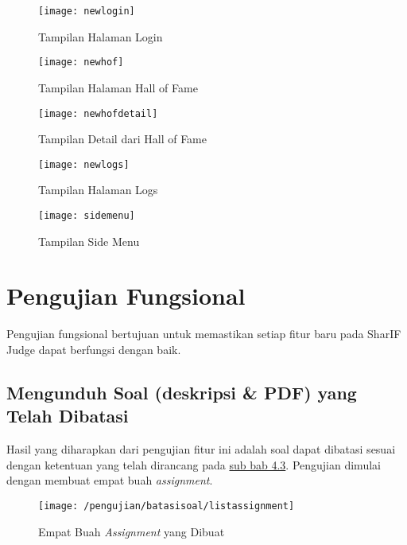 \begin{enumerate}
	\begin{figure}[H]
		\centering  
		\texttt{[image: newlogin]}  
		\caption[Tampilan Halaman Login]{Tampilan Halaman Login} 
		\label{fig:newlogin} 
	\end{figure}
	
	\begin{figure}[H]
		\centering  
		\texttt{[image: newhof]}  
		\caption[Tampilan Halaman Hall of Fame]{Tampilan Halaman Hall of Fame} 
		\label{fig:newhof} 
	\end{figure}

	\begin{figure}[H]
		\centering  
		\texttt{[image: newhofdetail]}  
		\caption[Tampilan Detail dari Hall of Fame]{Tampilan Detail dari Hall of Fame} 
		\label{fig:newhofdetail} 
	\end{figure}

	\begin{figure}[H]
		\centering  
		\texttt{[image: newlogs]}  
		\caption[Tampilan Halaman Logs]{Tampilan Halaman Logs} 
		\label{fig:newlogs} 
	\end{figure}

	\begin{figure}[H]
		\centering  
		\texttt{[image: sidemenu]}  
		\caption[Tampilan Side Menu]{Tampilan Side Menu} 
		\label{fig:sidemenu} 
	\end{figure}
\end{enumerate}

\section{Pengujian Fungsional}
Pengujian fungsional bertujuan untuk memastikan setiap fitur baru pada SharIF Judge dapat berfungsi dengan baik.
	\subsection{Mengunduh Soal (deskripsi \& PDF) yang Telah Dibatasi} 
	Hasil yang diharapkan dari pengujian fitur ini adalah soal dapat dibatasi sesuai dengan ketentuan yang telah dirancang pada \hyperref[chap:batassoal]{sub bab 4.3}. Pengujian dimulai dengan membuat empat buah \textit{assignment}.
	\begin{figure}[H]
		\centering  
		\texttt{[image: /pengujian/batasisoal/listassignment]}  
		\caption[Empat Buah \textit{Assignment} yang Dibuat]{Empat Buah \textit{Assignment} yang Dibuat} 
		\label{fig:listassignment} 
	\end{figure}
	
